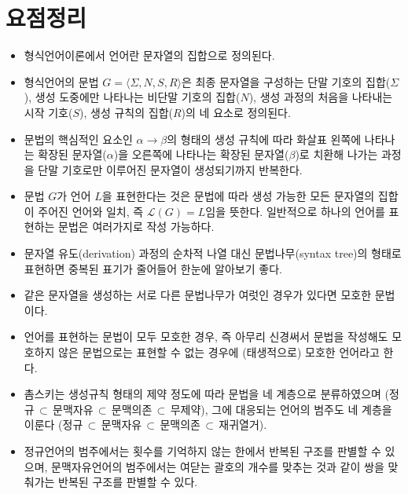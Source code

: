 \section*{요점정리}
\begin{itemize}
    \item 형식언어이론에서 언어란 문자열의 집합으로 정의된다.
    \item 형식언어의 문법 $G=\langle\Sigma,N,S,R\rangle$은
    최종 문자열을 구성하는 단말 기호의 집합($\Sigma$),
    생성 도중에만 나타나는 비단말 기호의 집합($N$),
    생성 과정의 처음을 나타내는 시작 기호($S$),
    생성 규칙의 집합($R$)의 네 요소로 정의된다.
    \item 문법의 핵심적인 요소인 $\alpha\to\beta$의 형태의 생성 규칙에 따라
    화살표 왼쪽에 나타나는 확장된 문자열($\alpha$)을 오른쪽에 나타나는
    확장된 문자열($\beta$)로 치환해 나가는 과정을 단말 기호로만 이루어진
    문자열이 생성되기까지 반복한다.
    \item 문법 $G$가 언어 $L$을 표현한다는 것은 문법에 따라 생성 가능한 모든
    문자열의 집합이 주어진 언어와 일치, 즉 $\mathcal{L}(G) = L$임을 뜻한다.
    일반적으로 하나의 언어를 표현하는 문법은 여러가지로 작성 가능하다.
    \item 문자열 유도(derivation) 과정의 순차적 나열 대신
    문법나무(syntax tree)의 형태로 표현하면 중복된 표기가 줄어들어
    한눈에 알아보기 좋다.
    \item 같은 문자열을 생성하는 서로 다른 문법나무가 여럿인 경우가
    있다면 모호한 문법이다.
    \item 언어를 표현하는 문법이 모두 모호한 경우, 즉 아무리 신경써서
    문법을 작성해도 모호하지 않은 문법으로는 표현할 수 없는 경우에
    (태생적으로) 모호한 언어라고 한다.
    \item 촘스키는 생성규칙 형태의 제약 정도에 따라 문법을 네 계층으로 분류하였으며
    (정규$\,\subset\,$문맥자유$\,\subset\,$문맥의존$\,\subset\,$무제약),
    그에 대응되는 언어의 범주도 네 계층을 이룬다
    (정규$\,\subset\,$문맥자유$\,\subset\,$문맥의존$\,\subset\,$재귀열거).
    \item 정규언어의 범주에서는 횟수를 기억하지 않는 한에서 반복된 구조를
    판별할 수 있으며, 문맥자유언어의 범주에서는 여닫는 괄호의 개수를 맞추는
    것과 같이 쌍을 맞춰가는 반복된 구조를 판별할 수 있다.
\end{itemize}

